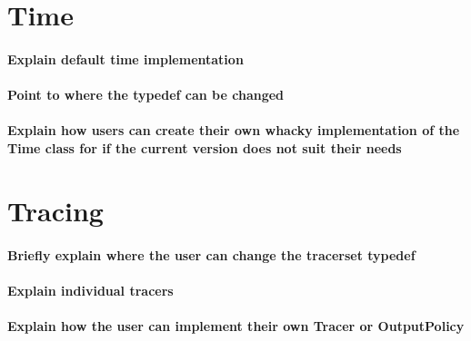 \section{Time}
\paragraph{Explain default time implementation}
\paragraph{Point to where the typedef can be changed}
\paragraph{Explain how users can create their own whacky implementation of the Time class for if the current version does not suit their needs}

\section{Tracing}
\paragraph{Briefly explain where the user can change the tracerset typedef}
\paragraph{Explain individual tracers}
\paragraph{Explain how the user can implement their own Tracer or OutputPolicy}